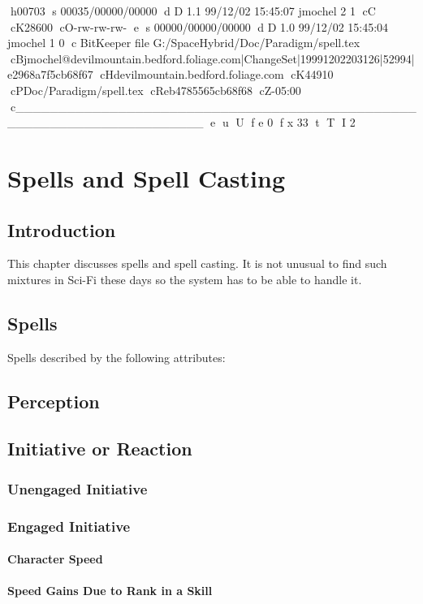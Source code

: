 h00703
s 00035/00000/00000
d D 1.1 99/12/02 15:45:07 jmochel 2 1
cC
cK28600
cO-rw-rw-rw-
e
s 00000/00000/00000
d D 1.0 99/12/02 15:45:04 jmochel 1 0
c BitKeeper file G:/SpaceHybrid/Doc/Paradigm/spell.tex
cBjmochel@devilmountain.bedford.foliage.com|ChangeSet|19991202203126|52994|e2968a7f5cb68f67
cHdevilmountain.bedford.foliage.com
cK44910
cPDoc/Paradigm/spell.tex
cReb4785565cb68f68
cZ-05:00
c______________________________________________________________________
e
u
U
f e 0
f x 33
t
T
I 2
\chapter{Spells and Spell Casting}

\section{Introduction}

This chapter discusses spells and spell casting. It is not unusual to
find such mixtures in Sci-Fi these days so the system has to be able to
handle it.

\section{Spells}

Spells described by the following attributes:

\section{Perception}
\section{Initiative or Reaction}
\subsection{Unengaged Initiative}
\subsection{Engaged Initiative}
\subsubsection{Character Speed}
\subsubsection{Speed Gains Due to Rank in a Skill}
